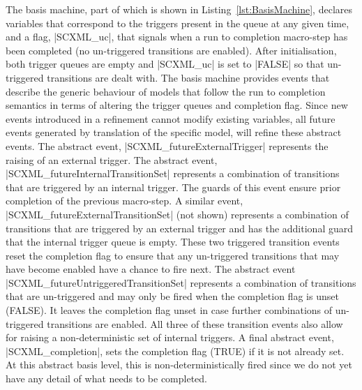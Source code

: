 The basis machine, part of which is shown in Listing~\ref{lst:BasisMachine}, declares variables that correspond to the triggers present in the queue at any given time, and a flag, |SCXML_uc|, that signals when a run to completion macro-step has been completed (no un-triggered transitions are enabled). 
After initialisation, both trigger queues are empty and |SCXML_uc| is set to |FALSE| so that un-triggered transitions are dealt with. 
The basis machine provides events that describe the generic behaviour of models that follow the run to completion semantics in terms of altering the trigger queues and completion flag.
Since new events introduced in a refinement cannot modify existing variables, all future events generated by translation of the specific \SCXML model, will refine these abstract events.
The abstract event, |SCXML_futureExternalTrigger| represents the raising of an external trigger.    
The abstract event, |SCXML_futureInternalTransitionSet| represents a combination of transitions that are triggered by an internal trigger. 
The guards of this event ensure prior completion of the previous macro-step. 
A similar event, |SCXML_futureExternalTransitionSet| (not shown) represents a combination of transitions that are triggered by an external trigger and has the additional guard that the internal trigger queue is empty.
These two triggered transition events reset the completion flag to ensure that any un-triggered transitions that may have become enabled have a chance to fire next.
The abstract event |SCXML_futureUntriggeredTransitionSet| represents a combination of transitions that are un-triggered and may only be fired when the completion flag is unset (FALSE).
It leaves the completion flag unset in case further combinations of un-triggered transitions are enabled.
All three of these transition events also allow for raising a non-deterministic set of internal triggers.
A final abstract event, |SCXML_completion|, sets the completion flag (TRUE) if it is not already set. At this abstract basis level, this is non-deterministically fired since we do not yet have any detail of what needs to be completed.

